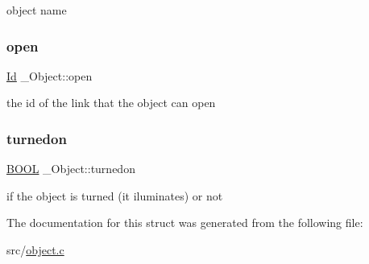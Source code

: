 object name \mbox{\label{struct__Object_a0922dd9891e6aa617ce1d51ae27c0175}} 
\subsubsection{\texorpdfstring{open}{open}}
{\footnotesize\ttfamily \hyperlink{types_8h_a845e604fb28f7e3d97549da3448149d3}{Id} \+\_\+\+Object\+::open}

the id of the link that the object can open \mbox{\label{struct__Object_a402198da362af7d49255f7e749d438be}} 
\subsubsection{\texorpdfstring{turnedon}{turnedon}}
{\footnotesize\ttfamily \hyperlink{types_8h_a3e5b8192e7d9ffaf3542f1210aec18dd}{B\+O\+OL} \+\_\+\+Object\+::turnedon}

if the object is turned (it iluminates) or not 

The documentation for this struct was generated from the following file\+:\begin{DoxyCompactItemize}
\item 
src/\hyperlink{object_8c}{object.\+c}\end{DoxyCompactItemize}
